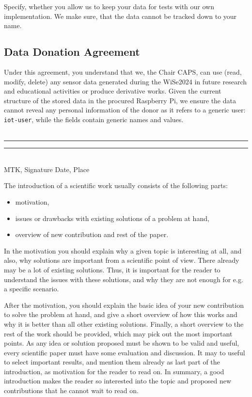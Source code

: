 \documentclass[A4,10pt]{article}
\begin{document}
Specify, whether you allow us to keep your data for tests with our own implementation. We make sure, that the data cannot be tracked down to your name. 

\subsection{Data Donation Agreement}
Under this agreement, you understand that we, the Chair CAPS, can use (read, modify, delete) any sensor data generated during the WiSe2024 in future research and educational activities or produce derivative works. Given the current structure of the stored data in the procured Raspberry Pi, we ensure the data cannot reveal any personal information of the donor as it refers to a generic user: \texttt{iot-user}, while the fields contain generic names and values.
\bigskip
\\
\\

\noindent\rule{5cm}{0.4pt} \hfill \noindent\rule{5cm}{0.4pt}\\
MTK, Signature \hfill Date, Place

\pagebreak
\label{introduction}

The introduction of a scientific work usually consists of the following
parts:

\begin{itemize}
	\item motivation,
	\item issues or drawbacks with existing solutions of a problem at 
hand,
	\item overview of new contribution and rest of the paper.
\end{itemize}

In the motivation you should explain why a given topic is interesting
at all, and also, why solutions are important from a scientific point
of view. There already may be a lot of existing solutions. Thus, it
is important for the reader to understand the issues with these solutions,
and why they are not enough for e.g. a specific scenario.

After the motivation, you should explain the basic idea of your new
contribution to solve the problem at hand, and give a short overview
of how this works and why it is better than all other existing solutions.
Finally, a short overview to the rest of the work should be provided,
which may pick out the most important points. As any idea or solution
proposed must be shown to be valid and useful, every scientific paper
must have some evaluation and discussion. It may to useful to select
important results, and mention them already as last part of the
introduction, as motivation for the reader to read on. In summary,
a good introduction makes the reader so interested into the topic and
proposed new contributions that he cannot wait to read on.
\end{document}
